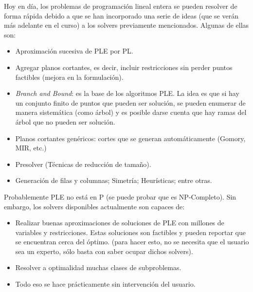 Hoy en día, los problemas de programación lineal entera se pueden resolver de forma rápida debido a que se han incorporado una serie de ideas (que se verán más adelante en el curso) a los solvers previamente mencionados. Algunas de ellas son:
\begin{itemize}
    \item Aproximación sucesiva de PLE por PL.
    \item Agregar planos cortantes, es decir, incluir restricciones sin perder puntos factibles (mejora en la formulación).
    \item \textit{Branch and Bound}: es la base de los algoritmos PLE. La idea es que si hay un conjunto finito de puntos que pueden ser solución, se pueden enumerar de manera sistemática (como árbol) y es posible darse cuenta que hay ramas del árbol que no pueden ser solución.
    \item Planos cortantes genéricos: cortes que se generan automáticamente (Gomory, MIR, etc.)
    \item Presolver (Técnicas de reducción de tamaño).
    \item Generación de filas y columnas; Simetría; Heurísticas; entre otras.
\end{itemize}

Probablemente PLE no está en P (se puede probar que es NP-Completo). Sin embargo, los solvers disponibles actualmente son capaces de:
\begin{itemize}
    \item Realizar buenas aproximaciones de soluciones de PLE con millones de variables y restricciones. Estas soluciones son factibles y pueden reportar que se encuentran cerca del óptimo. (para hacer esto, no se necesita que el usuario sea un experto, sólo basta con saber ocupar dichos solvers).
    \item Resolver a optimalidad muchas clases de subproblemas.
    \item Todo eso se hace prácticamente sin intervención del usuario.
\end{itemize}

